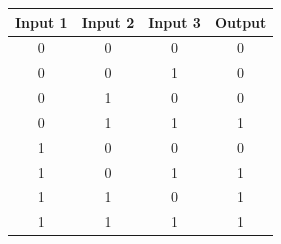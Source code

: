 \begin{figure}[H]
  \begin{subfigure}[t]{.49\columnwidth}
    \begin{adjustbox}{width=\textwidth}
    \begin{tabular}[b]{cccc}
      \hline
    \multicolumn{1}{l}{\textbf{Input 1}} & \multicolumn{1}{l}{\textbf{Input 2}} & \multicolumn{1}{l}{\textbf{Input 3}} & \multicolumn{1}{l}{\textbf{Output}} \\
    \hline
    0 & 0                                    & 0                                    & 0                                   \\
    0 & 0                                    & 1                                    & 0                                   \\
    0 & 1                                    & 0                                    & 0                                   \\
    0 & 1                                    & 1                                    & 1                                   \\
    1 & 0                                    & 0                                    & 0                                   \\
    1 & 0                                    & 1                                    & 1                                   \\
    1 & 1                                    & 0                                    & 1                                   \\
    1 & 1                                    & 1                                    & 1                                   \\


\end{tabular}
\end{adjustbox}
\end{subfigure}
\end{figure}
